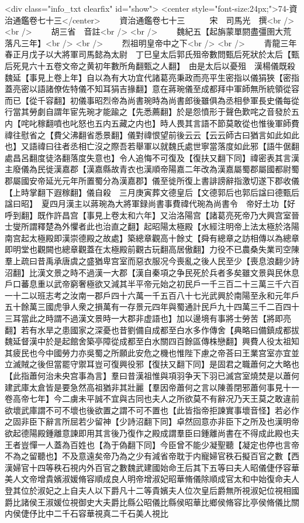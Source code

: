 <div class="info_txt clearfix" id="show">
<center style="font-size:24px;">74-資治通鑑卷七十三</center>
  　　資治通鑑卷七十三　　　宋　司馬光　撰<br />
<br />
　　胡三省　音註<br />
<br />
　　魏紀五【起旃蒙單閼盡彊圉大荒落凡三年】<br />
<br />
　　烈祖明皇帝中之下<br />
<br />
　　青龍三年春正月戊子以大將軍司馬懿為太尉　丁巳皇太后郭氏殂帝數問甄后死狀於太后【甄后死見六十五卷文帝之黄初年數所角翻甄之人翻】　由是太后以憂殂　漢楊儀既殺魏延【事見上卷上年】自以為有大功宜代諸葛亮秉政而亮平生密指以儀狷狹【密指蓋亮密以語諸僚佐特儀不知耳狷吉掾翻】意在蔣琬儀至成都拜中軍師無所統領從容而已【從千容翻】初儀事昭烈帝為尚書琬時為尚書郎後雖俱為丞相參軍長史儀每從行當其勞劇自謂年宦先琬才能踰之【先悉薦翻】於是怨憤形于聲色歎咤之音發於五内【咤叱稼翻噴也叱怒也五内五藏之内也】時人畏其言語不節莫敢從也惟後軍師費禕往慰省之【費父沸翻省悉景翻】儀對禕恨望前後云云【云云師古曰猶言如此如此也】又語禕曰往者丞相亡沒之際吾若舉軍以就魏氏處世寧當落度如此邪【語牛倨翻處昌呂翻度徒洛翻落度失意也】令人追悔不可復及【復扶又翻下同】禕密表其言漢主廢儀為民徙漢嘉郡【漢嘉縣故青衣也漢順帝陽嘉二年改為漢嘉屬蜀郡屬國都尉蜀郡屬國安帝延光元年所置蜀分為漢嘉郡】儀至徙所復上書誹謗辭指激切遂下郡收儀【上時掌翻下遐稼翻】儀自殺　三月庚寅葬文德皇后【文德郭后也郭后諡曰德甄后諡曰昭】　夏四月漢主以蔣琬為大將軍録尚書事費禕代琬為尚書令　帝好土功【好呼到翻】既作許昌宫【事見上卷太和六年】又治洛陽宫【諸葛亮死帝乃大興宫室晉士燮所謂釋楚為外懼者此也治直之翻】起昭陽太極殿【水經注明帝上法太極於洛陽南宫起太極殿即漢崇德殿之故處】築總章觀高十餘丈【舜有總章之訪相傳以為總章即明堂也觀闕也總章觀蓋在太極殿前觀古玩翻高居傲翻】力役不已農桑失業司空陳羣上疏曰昔禹承唐虞之盛猶卑宫室而惡衣服况今喪亂之後人民至少【喪息浪翻少詩沼翻】比漢文景之時不過漢一大郡【漢自秦項之争民死於兵者多矣雖文景與民休息戶口蕃息重以武帝窮奢極欲又減其半平帝元始之初民戶一千三百二十三萬三千六百一十二以班志考之汝南一郡戶四十六萬一千五百八十七光武興於南陽至永和元年戶五十餘萬三國虎爭人衆之損萬有一存景元四年與蜀通計民戶九十四萬三千二百四十三耳當此之時謂不過漢文景時一大郡非虚語也】加以邊境有事將士勞苦【將即亮翻】若有水旱之患國家之深憂也昔劉備自成都至白水多作傳舍【典略曰備鎮成都拔魏延督漢中於是起館舍築亭障從成都至白水關四百餘區傳株戀翻】興費人役太祖知其疲民也今中國勞力亦吳蜀之所願此安危之機也惟陛下慮之帝荅曰王業宫室亦宜並立滅賊之後但當罷守禦耳豈可復興役邪【復扶又翻下同】是固君之職蕭何之大略也【此指蕭何治未央宫事為言】羣曰昔漢祖惟與項羽争天下羽已滅宫室燒焚是以蕭何建武庫太倉皆是要急然高祖猶非其壯麗【羣因帝蕭何之言以陳善閉邪蕭何事見十一卷高帝七年】今二虜未平誠不宜與古同也夫人之所欲莫不有辭况乃天王莫之敢違前欲壞武庫謂不可不壞也後欲置之謂不可不置也【此皆指帝拒諫實事壞音怪】若必作之固非臣下辭言所屈若少留神【少詩沼翻下同】卓然回意亦非臣下之所及也漢明帝欲起德陽殿鍾離意諫即用其言後乃復作之殿成謂羣臣曰鍾離尚書在不得成此殿也夫王者豈憚一人蓋為百姓也【為于偽翻下同】今臣曾不能少凝聖聽【凝定也停也言帝不為之留聽也】不及意遠矣帝乃為之少有減省帝耽于内寵婦官秩石擬百官之數【西漢婦官十四等秩石視内外百官之數魏武建國始命王后其下五等曰夫人昭儀倢伃容華美人文帝增貴嬪淑媛脩容順成良人明帝增淑妃昭華脩儀除順成官太和中始復命夫人登其位於淑妃之上自夫人以下爵凡十二等貴嬪夫人位次皇后爵無所視淑妃位視相國爵比諸侯王淑媛位視御史大夫爵比縣公昭儀比縣侯昭華比鄉侯脩容比亭侯脩儀比關内侯倢伃比中二千石容華視真二千石美人視比